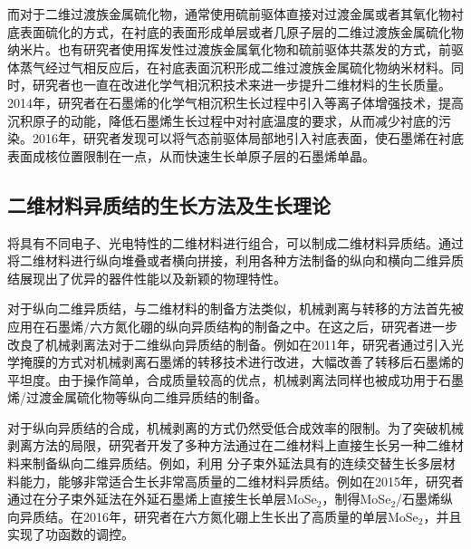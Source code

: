     而对于二维过渡族金属硫化物，通常使用硫前驱体直接对过渡金属或者其氧化物衬底表面硫化的方式，在衬底的表面形成单层或者几原子层的二维过渡族金属硫化物纳米片。也有研究者使用挥发性过渡族金属氧化物和硫前驱体共蒸发的方式，前驱体蒸气经过气相反应后，在衬底表面沉积形成二维过渡族金属硫化物纳米材料。同时，研究者也一直在改进化学气相沉积技术来进一步提升二维材料的生长质量。2014年，研究者在石墨烯的化学气相沉积生长过程中引入等离子体增强技术，提高沉积原子的动能，降低石墨烯生长过程中对衬底温度的要求，从而减少衬底的污染。2016年，研究者发现可以将气态前驱体局部地引入衬底表面，使石墨烯在衬底表面成核位置限制在一点，从而快速生长单原子层的石墨烯单晶。

\subsection{二维材料异质结的生长方法及生长理论}
    将具有不同电子、光电特性的二维材料进行组合，可以制成二维材料异质结。通过将二维材料进行纵向堆叠或者横向拼接，利用各种方法制备的纵向和横向二维异质结展现出了优异的器件性能以及新颖的物理特性。

    对于纵向二维异质结，与二维材料的制备方法类似，机械剥离与转移的方法首先被应用在石墨烯/六方氮化硼的纵向异质结构的制备之中。在这之后，研究者进一步改良了机械剥离法对于二维纵向异质结的制备。例如在2011年，研究者通过引入光学掩膜的方式对机械剥离石墨烯的转移技术进行改进，大幅改善了转移后石墨烯的平坦度。由于操作简单，合成质量较高的优点，机械剥离法同样也被成功用于石墨烯/过渡金属硫化物等纵向二维异质结的制备。

    对于纵向异质结的合成，机械剥离的方式仍然受低合成效率的限制。为了突破机械剥离方法的局限，研究者开发了多种方法通过在二维材料上直接生长另一种二维材料来制备纵向二维异质结。例如，利用
    分子束外延法具有的连续交替生长多层材料能力，能够非常适合生长非常高质量的二维材料异质结。例如在2015年，研究者通过在分子束外延法在外延石墨烯上直接生长单层MoSe$_2$，制得MoSe$_2$/石墨烯纵向异质结。在2016年，研究者在六方氮化硼上生长出了高质量的单层MoSe$_2$，并且实现了功函数的调控。

